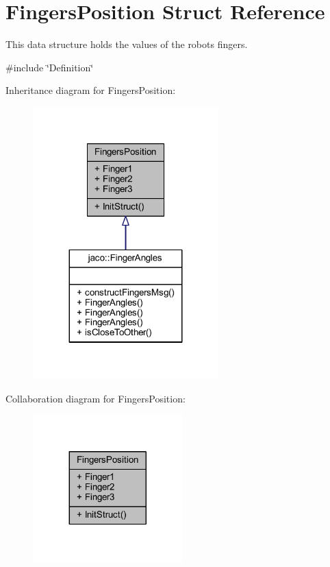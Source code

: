 \hypertarget{structFingersPosition}{}\section{Fingers\+Position Struct Reference}
\label{structFingersPosition}


This data structure holds the values of the robot\textquotesingle{}s fingers.  




{\ttfamily \#include \char`\"{}Definition\char`\"{}}



Inheritance diagram for Fingers\+Position\+:
\nopagebreak
\begin{figure}[H]
\begin{center}
\leavevmode
\includegraphics[width=203pt]{d5/dbd/structFingersPosition__inherit__graph}
\end{center}
\end{figure}


Collaboration diagram for Fingers\+Position\+:
\nopagebreak
\begin{figure}[H]
\begin{center}
\leavevmode
\includegraphics[width=164pt]{d0/d2e/structFingersPosition__coll__graph}
\end{center}
\end{figure}
